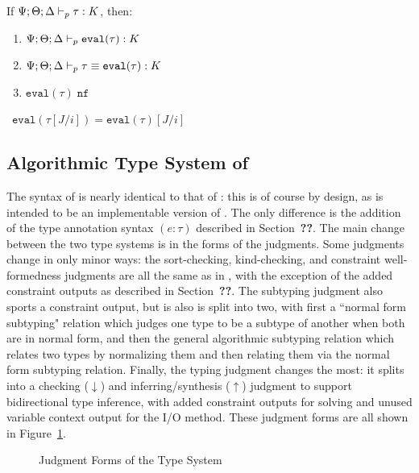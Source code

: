 \begin{theorem}
If $\Psi ; \Theta ; \Delta \vdash_p \tau : K$, then:
\begin{enumerate}
  \item $\Psi ; \Theta ; \Delta \vdash_p \texttt{eval}(\tau) : K$
  \item $\Psi ; \Theta ; \Delta \vdash_p \tau \equiv \texttt{eval}(\tau) : K$
  \item $\texttt{eval}(\tau) \; \texttt{nf}$
\end{enumerate}
\label{thm:norm-thm}
\end{theorem}


\begin{theorem}
~$\texttt{eval}(\tau[J/i]) = \texttt{eval}(\tau)[J/i]$
\label{thm:idx-subst-eval}
\end{theorem}

\subsection{Algorithmic Type System of \bilambdaamor}
The syntax of \bilambdaamor is nearly identical to that of \dlambdaamor: this is of course by design, as \bilambdaamor is intended to be an implementable version of \dlambdaamor. The only difference is the addition of the type annotation syntax $(e : \tau)$ described in Section~\textbf{??}. The main change between the two type systems is in the forms of the judgments. Some judgments change in only minor ways: the sort-checking, kind-checking, and constraint well-formedness judgments are all the same as in \dlambdaamor, with the exception of the added constraint outputs as described in Section~\textbf{??}. The subtyping judgment also sports a constraint output, but is also is split into two, with first a ``normal form subtyping" relation which judges one type to be a subtype of another when both are in normal form, and then the general algorithmic subtyping relation which relates two types by normalizing them and then relating them via the normal form subtyping relation. Finally, the typing judgment changes the most: it splits into a checking ($\downarrow$) and inferring/synthesis ($\uparrow$) judgment to support bidirectional type inference, with added constraint outputs for solving and unused variable context output for the I/O method. These judgment forms are all shown in Figure~\ref{fig:bilambdaamor-typing-judgments}.

\begin{figure}
\label{fig:bilambdaamor-typing-judgments}
\caption{Judgment Forms of the \bilambdaamor Type System}
\end{figure}

